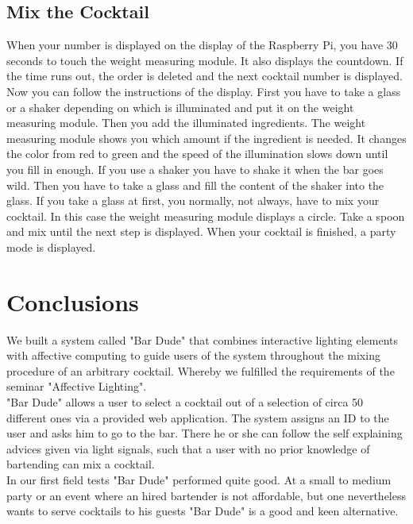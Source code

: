 \documentclass{acm_proc_article-sp}
\begin{document}
 \subsection{Mix the Cocktail}
When your number is displayed on the display of the Raspberry Pi, you have 30 seconds to touch the weight measuring module. It also displays the countdown. If the time runs out, the order is deleted and the next cocktail number is displayed. \\
Now you can follow the instructions of the display. First you have to take a glass or a shaker depending on which is illuminated and put it on the weight measuring module. Then you add the illuminated ingredients. The weight measuring module shows you which amount if the ingredient is needed. It changes the color from red to green and the speed of the illumination slows down until you fill in enough. If you use a shaker you have to shake it when the bar goes wild. Then you have to take a glass and fill the content of the shaker into the glass. If you take a glass at first, you normally, not always, have to mix your cocktail. In this case the weight measuring module displays a circle. Take a spoon and mix until the next step is displayed. When your cocktail is finished, a party mode is displayed. 


\section{Conclusions}
We built a system called "Bar Dude" that combines interactive lighting elements with affective computing to guide users of the system throughout the mixing procedure of an arbitrary cocktail. Whereby we fulfilled the requirements of the seminar "Affective Lighting". \\
"Bar Dude" allows a user to select a cocktail out of a selection of circa 50 different ones via a provided web application. The system assigns an ID to the user and asks him to go to the bar. There he or she can follow the self explaining advices given via light signals, such that a user with no prior knowledge of bartending can mix a cocktail. \\
In our first field tests "Bar Dude" performed quite good. At a small to medium party or an event where an hired bartender is not affordable, but one nevertheless wants to serve cocktails to his guests "Bar Dude" is a good and keen alternative.
\end{document}
